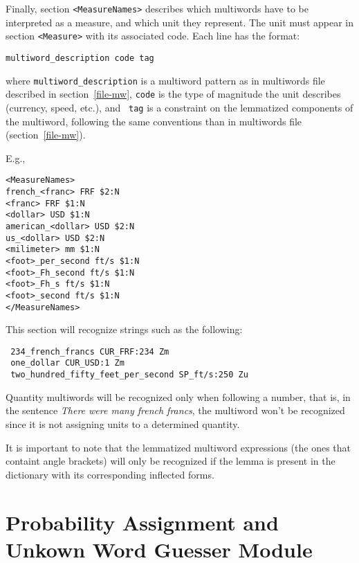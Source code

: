 \documentclass[a4paper]{book}
\begin{document}
Finally, section \verb#<MeasureNames># describes which multiwords have
to be interpreted as a measure, and which unit they represent. The
unit must appear in section \verb#<Measure># with its associated code.
Each line has the format:
\begin{verbatim}
multiword_description code tag
\end{verbatim}
where {\tt multiword\_description} is a multiword pattern as in
multiwords file described in section~\ref{file-mw}, {\tt code} is the
type of magnitude the unit describes (currency, speed, etc.), and {\tt
tag} is a constraint on the lemmatized components of the multiword,
following the same conventions than in multiwords file
(section~\ref{file-mw}).

E.g., 
\begin{verbatim}
<MeasureNames>
french_<franc> FRF $2:N
<franc> FRF $1:N
<dollar> USD $1:N
american_<dollar> USD $2:N
us_<dollar> USD $2:N
<milimeter> mm $1:N
<foot>_per_second ft/s $1:N
<foot>_Fh_second ft/s $1:N
<foot>_Fh_s ft/s $1:N
<foot>_second ft/s $1:N
</MeasureNames>
\end{verbatim}

This section will recognize strings such as the following:
\begin{verbatim}
 234_french_francs CUR_FRF:234 Zm
 one_dollar CUR_USD:1 Zm
 two_hundred_fifty_feet_per_second SP_ft/s:250 Zu
\end{verbatim}

 Quantity multiwords will be recognized only when following a number,
 that is, in the sentence {\em There were many french francs}, the
 multiword won't be recognized since it is not assigning units to a
 determined quantity.

 It is important to note that the lemmatized multiword expressions
 (the ones that containt angle brackets) will only be recognized if
 the lemma is present in the dictionary with its corresponding
 inflected forms.


\section{Probability Assignment and Unkown Word Guesser Module}
\label{file-prob}
\end{document}
